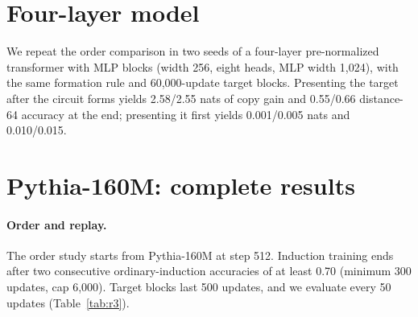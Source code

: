 \section{Four-layer model}
\label{app:breadth}
We repeat the order comparison in two seeds of a four-layer pre-normalized
transformer with MLP blocks (width 256, eight heads, MLP width 1,024), with the same
formation rule and 60,000-update target blocks. Presenting the target after the
circuit forms yields 2.58/2.55 nats of copy gain and 0.55/0.66 distance-64 accuracy
at the end; presenting it first yields 0.001/0.005 nats and 0.010/0.015.

\section{Pythia-160M: complete results}
\label{app:pythia}

\paragraph{Order and replay.}
The order study starts from Pythia-160M at step 512. Induction training ends after
two consecutive ordinary-induction accuracies of at least 0.70 (minimum 300 updates,
cap 6,000). Target blocks last 500 updates, and we evaluate every 50 updates
(Table~\ref{tab:r3}).

\begin{table}[!htbp]
\centering\small
\caption{Pythia-160M order and replay. $k$ is the induction-training length;
\emph{pre-replay} is target accuracy after induction training but before the target
stream is shown again. Streams 8 and 9 are paired within each run.}
\label{tab:r3}
\end{table}

